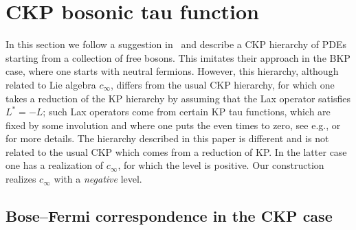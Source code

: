 \section{CKP bosonic tau function\label{CKPbosonic}}

In this section we follow a suggestion in~\cite{DJKMVI} and describe a CKP hierarchy of PDEs starting from  a collection of free bosons.
This imitates their approach in the BKP case, where one starts with neutral fermions.
However, this hierarchy, although related to Lie algebra $c_\infty$,
dif\/fers from the usual CKP hierarchy, for which one takes
a reduction of the KP hierarchy by assuming that the Lax operator
satisf\/ies $L^*=-L$; such Lax operators come from certain KP tau functions,
which are f\/ixed by some involution and where one puts the even times to zero,
see e.g., \cite{DJKMVI} or \cite{AL} for more details.
The hierarchy described in this paper is dif\/ferent and is not related to the
usual CKP which comes from a reduction of KP. In the latter case
one has a realization of $c_\infty$, for which the level is positive.
Our construction realizes  $c_\infty$ with a {\it negative\/} level.

\subsection[Bose-Fermi correspondence in the CKP case]{Bose--Fermi correspondence in the CKP case}\label{Bose-Fermi}

